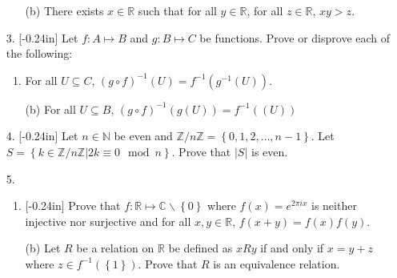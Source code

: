 \documentclass[letterpaper,12pt]{article}
\newcommand{\set}[1]{\left\{ #1 \right\}}
\theoremstyle{definition}
\begin{document}
\pagebreak
\begin{enumerate}
    \item[] \begin{enumerate}
        \item[(b)] There exists $x \in \mathbb{R}$ such that for all $y \in \mathbb{R}$, for all $z \in \mathbb{R}$, $xy > z$.
    \end{enumerate}
\end{enumerate}
\pagebreak
\begin{enumerate}
    \item[3. ]\reversemarginpar{}[-0.24in] Let $f: A \mapsto B$ and $g: B \mapsto C$ be functions. Prove or disprove each of the following: \begin{enumerate}
        \item For all $U \subseteq C$, $(g \circ f)^{-1} (U) = f^{-1}(g^{-1}(U))$.
        
    \end{enumerate}
\end{enumerate}
\pagebreak
\begin{enumerate}
    \item[] \begin{enumerate}
        \item[(b)] For all $U \subseteq B$, $(g\circ f)^{-1}(g(U)) = f^{-1}((U))$
    \end{enumerate}
\end{enumerate}
\pagebreak
\begin{enumerate}
    \item[4.]\reversemarginpar{}[-0.24in] Let $n \in \mathbb{N}$ be even and $\mathbb{Z} / n\mathbb{Z} = \set{0,1,2,\ldots,n-1}$. Let $S = \set{k \in \mathbb{Z} / n\mathbb{Z}| 2k \equiv 0 \mod n }$. Prove that $|S|$ is even.
\end{enumerate}
\pagebreak
\begin{enumerate}
    \item[5.] \begin{enumerate} \item \reversemarginpar{}[-0.24in] Prove that $f: \mathbb{R} \mapsto \mathbb{C}\backslash \set{0}$ where $f(x) = e^{2\pi i x}$ is neither injective nor surjective and for all $x,y \in \mathbb{R}$, $f(x+y) = f(x)f(y)$.
    \end{enumerate}
\end{enumerate}
\pagebreak
\begin{enumerate}
    \item[] \begin{enumerate}
        \item[(b)] Let $R$ be a relation on $\mathbb{R}$ be defined as $x R y$ if and only if $x = y + z$ where $z \in f^{-1}(\set{1})$. Prove that $R$ is an equivalence relation.
    \end{enumerate}
\end{enumerate}
\end{document}
